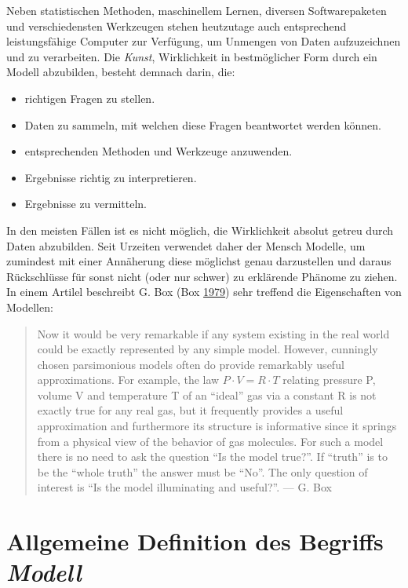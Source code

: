 \documentclass[]{article}
\providecommand{\tightlist}{%
  \setlength{\itemsep}{0pt}\setlength{\parskip}{0pt}}
\begin{document}
Neben statistischen Methoden, maschinellem Lernen, diversen
Softwarepaketen und verschiedensten Werkzeugen stehen heutzutage auch
entsprechend leistungsfähige Computer zur Verfügung, um Unmengen von
Daten aufzuzeichnen und zu verarbeiten. Die \emph{Kunst}, Wirklichkeit
in bestmöglicher Form durch ein Modell abzubilden, besteht demnach
darin, die:

\begin{itemize}
\tightlist
\item
  richtigen Fragen zu stellen.
\item
  Daten zu sammeln, mit welchen diese Fragen beantwortet werden können.
\item
  entsprechenden Methoden und Werkzeuge anzuwenden.
\item
  Ergebnisse richtig zu interpretieren.
\item
  Ergebnisse zu vermitteln.
\end{itemize}

In den meisten Fällen ist es nicht möglich, die Wirklichkeit absolut
getreu durch Daten abzubilden. Seit Urzeiten verwendet daher der Mensch
Modelle, um zumindest mit einer Annäherung diese möglichst genau
darzustellen und daraus Rückschlüsse für sonst nicht (oder nur schwer)
zu erklärende Phänome zu ziehen. In einem Artilel beschreibt G. Box (Box
\protect\hyperlink{ref-Box}{1979}) sehr treffend die Eigenschaften von
Modellen:

\begin{quote}
Now it would be very remarkable if any system existing in the real world
could be exactly represented by any simple model. However, cunningly
chosen parsimonious models often do provide remarkably useful
approximations. For example, the law \(P \cdot V = R \cdot T\) relating
pressure P, volume V and temperature T of an ``ideal'' gas via a
constant R is not exactly true for any real gas, but it frequently
provides a useful approximation and furthermore its structure is
informative since it springs from a physical view of the behavior of gas
molecules. For such a model there is no need to ask the question ``Is
the model true?''. If ``truth'' is to be the ``whole truth'' the answer
must be ``No''. The only question of interest is ``Is the model
illuminating and useful?''. --- G. Box
\end{quote}

\section*{\texorpdfstring{Allgemeine Definition des Begriffs
\emph{Modell}}{Allgemeine Definition des Begriffs Modell}}\label{allgemeine-definition-des-begriffs-modell}
\end{document}
